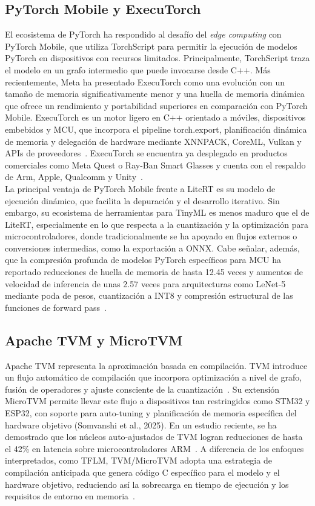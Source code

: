 \documentclass[a4paper,12pt,twoside,final]{book}
\begin{document}
\subsection{PyTorch Mobile y ExecuTorch}
El ecosistema de PyTorch ha respondido al desafío del \textit{edge computing} con PyTorch Mobile, que utiliza
TorchScript para permitir la ejecución de modelos PyTorch en dispositivos con recursos limitados. Principalmente,
TorchScript traza el modelo en un grafo intermedio que puede invocarse desde C$+$$+$. Más recientemente, Meta ha
presentado ExecuTorch como una evolución con un tamaño de memoria significativamente menor y una huella de memoria
dinámica que ofrece un rendimiento y portabilidad superiores en comparación con PyTorch Mobile. ExecuTorch es un
motor ligero en C$+$$+$ orientado a móviles, dispositivos embebidos y MCU, que incorpora el pipeline torch.export,
planificación dinámica de memoria y delegación de hardware mediante XNNPACK, CoreML, Vulkan y APIs de
proveedores~\cite{abushahla2025nnquantization}. ExecuTorch se encuentra ya desplegado en productos comerciales como
Meta Quest o Ray-Ban Smart Glasses y cuenta con el respaldo de Arm, Apple, Qualcomm y
Unity~\cite{abushahla2025nnquantization}.\\

La principal ventaja de PyTorch Mobile frente a LiteRT es su modelo de ejecución dinámico, que facilita la
depuración y el desarrollo iterativo. Sin embargo, su ecosistema de herramientas para TinyML es menos maduro que el
de LiteRT, especialmente en lo que respecta a la cuantización y la optimización para microcontroladores, donde
tradicionalmente se ha apoyado en flujos externos o conversiones intermedias, como la exportación a ONNX. Cabe
señalar, además, que la compresión profunda de modelos PyTorch específicos para MCU ha reportado reducciones de
huella de memoria de hasta 12.45 veces y aumentos de velocidad de inferencia de unas 2.57 veces para arquitecturas
como LeNet-5 mediante poda de pesos, cuantización a INT8 y compresión estructural de las funciones de forward
pass~\cite{dogan2021compressionpytorch}.

\subsection{Apache TVM y MicroTVM}
Apache TVM representa la aproximación basada en compilación. TVM introduce un flujo automático de compilación que
incorpora optimización a nivel de grafo, fusión de operadores y ajuste consciente de la
cuantización~\cite{somvanshi2025acm}. Su extensión MicroTVM permite llevar este flujo a dispositivos tan
restringidos como STM32 y ESP32, con soporte para auto-tuning y planificación de memoria específica del hardware
objetivo (Somvanshi et al., 2025). En un estudio reciente, se ha demostrado que los núcleos auto-ajustados de TVM
logran reducciones de hasta el 42\% en latencia sobre microcontroladores ARM~\cite{chinnaraju2025wjarr}. A
diferencia de los enfoques interpretados, como TFLM, TVM/MicroTVM adopta una estrategia de compilación anticipada
que genera código C específico para el modelo y el hardware objetivo, reduciendo así la sobrecarga en tiempo de
ejecución y los requisitos de entorno en memoria~\cite{liu2024microtvm}.\\
\end{document}
